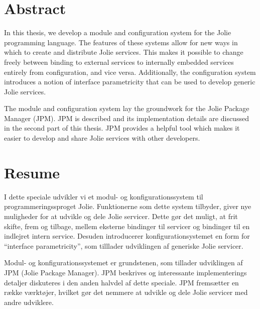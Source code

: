 \pagestyle{empty}
\vspace*{\fill}%

\section*{Abstract}

In this thesis, we develop a module and configuration system for the Jolie
programming language. The features of these systems allow for new ways in which
to create and distribute Jolie services. This makes it possible to change
freely between binding to external services to internally embedded services
entirely from configuration, and vice versa. Additionally, the configuration
system introduces a notion of interface parametricity that can be used to
develop generic Jolie services.

The module and configuration system lay the groundwork for the Jolie Package
Manager (JPM). JPM is described and its implementation details are discussed in
the second part of this thesis. JPM provides a helpful tool which makes it
easier to develop and share Jolie services with other developers.

\section*{Resume}

I dette speciale udvikler vi et modul- og konfigurationssystem til
programmeringssproget Jolie. Funktionerne som dette system tilbyder, giver nye
muligheder for at udvikle og dele Jolie servicer. Dette gør det muligt, at frit
skifte, frem og tilbage, mellem eksterne bindinger til servicer og bindinger
til en indlejret intern service. Desuden introducerer konfigurationsystemet en
form for ``interface parametricity'', som tilllader udviklingen af generiske
Jolie servicer.

Modul- og konfigurationssystemet er grundstenen, som tillader udviklingen af
JPM (Jolie Package Manager). JPM beskrives og interessante implementerings
detaljer diskuteres i den anden halvdel af dette speciale. JPM fremsætter en
række værktøjer, hvilket gør det nemmere at udvikle og dele Jolie servicer med
andre udviklere.

\vspace*{\fill}%
